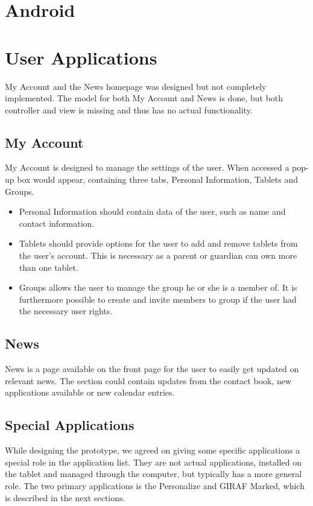 \section{Android}


\section{User Applications}

My Account and the News homepage was designed but not completely implemented. The model for both My Account and News is done, but both controller and view is missing and thus has no actual functionality.

\subsection{My Account}
My Account is designed to manage the settings of the user. When accessed a pop-up box would appear, containing three tabs, Personal Information, Tablets and Groups. 
\begin{itemize}
\item Personal Information should contain data of the user, such as name and contact information.
\item Tablets should provide options for the user to add and remove tablets from the user's account. This is necessary as a parent or guardian can own more than one tablet.
\item Groups allows the user to manage the group he or she is a member of. It is furthermore possible to create and invite members to group if the user had the necessary user rights.
\end{itemize} 

\subsection{News}
News is a page available on the front page for the user to easily get updated on relevant news. The section could contain updates from the contact book, new applications available or new calendar entries.   

\subsection{Special Applications}
While designing the prototype, we agreed on giving some specific applications a special role in the application list. They are not actual applications, installed on the tablet and managed through the computer, but typically has a more general role. The two primary applications is the Personalize and GIRAF Marked, which is described in the next sections. 

